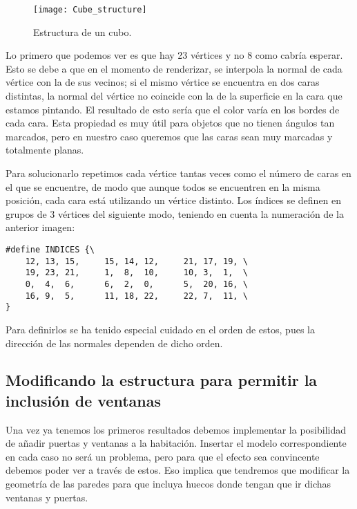 \begin{figure}[H]
	\centering
	\texttt{[image: Cube\_structure]}
	\caption{Estructura de un cubo.}
	\label{fig:estructura_cubo}
\end{figure}

Lo primero que podemos ver es que hay 23 vértices y no 8 como cabría esperar. Esto se debe a que en el momento de renderizar, se interpola la normal de cada vértice con la de sus vecinos; si el mismo vértice se encuentra en dos caras distintas, la normal del vértice no coincide con la de la superficie en la cara que estamos pintando. El resultado de esto sería que el color varía en los bordes de cada cara. Esta propiedad es muy útil para objetos que no tienen ángulos tan marcados, pero en nuestro caso queremos que las caras sean muy marcadas y totalmente planas.

Para solucionarlo repetimos cada vértice tantas veces como el número de caras en el que se encuentre, de modo que aunque todos se encuentren en la misma posición, cada cara está utilizando un vértice distinto. Los índices se definen en grupos de 3 vértices del siguiente modo, teniendo en cuenta la numeración de la anterior imagen:

\begin{lstlisting}
#define INDICES {\
    12, 13, 15,     15, 14, 12,     21, 17, 19, \
    19, 23, 21,     1,  8,  10,     10, 3,  1,  \
    0,  4,  6,      6,  2,  0,      5,  20, 16, \
    16, 9,  5,      11, 18, 22,     22, 7,  11, \
}
\end{lstlisting}

Para definirlos se ha tenido especial cuidado en el orden de estos, pues la dirección de las normales dependen de dicho orden.

\subsection{Modificando la estructura para permitir la inclusión de ventanas}
\label{subsec:gen2}
Una vez ya tenemos los primeros resultados debemos implementar la posibilidad de añadir puertas y ventanas a la habitación. Insertar el modelo correspondiente en cada caso no será un problema, pero para que el efecto sea convincente debemos poder ver a través de estos. Eso implica que tendremos que modificar la geometría de las paredes para que incluya huecos donde tengan que ir dichas ventanas y puertas.

